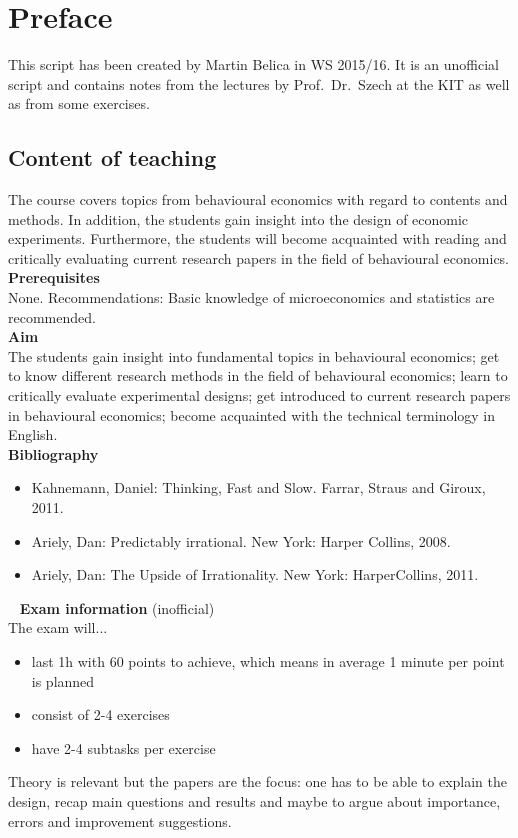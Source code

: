 

\chapter*{Preface}
This script has been created by Martin Belica in WS 2015/16. It is an unofficial script and contains notes from the lectures by Prof.~Dr.~Szech at the KIT as well as from some exercises.
\section*{Content of teaching}
The course covers topics from behavioural economics with regard to contents and methods. In addition, the students gain insight into the design of economic experiments. Furthermore, the students will become acquainted with reading and critically evaluating current research papers in the field of behavioural economics. \\

\textbf{Prerequisites} \\
None. Recommendations: Basic knowledge of microeconomics and statistics are recommended. \\

\textbf{Aim} \\
The students gain insight into fundamental topics in behavioural economics;
get to know different research methods in the field of behavioural economics;
learn to critically evaluate experimental designs;
get introduced to current research papers in behavioural economics;
become acquainted with the technical terminology in English. \\

\textbf{Bibliography}
\begin{itemize}
	\item Kahnemann, Daniel: Thinking, Fast and Slow. Farrar, Straus and Giroux, 2011.
	\item Ariely, Dan: Predictably irrational. New York: Harper Collins, 2008.
	\item Ariely, Dan: The Upside of Irrationality. New York: HarperCollins, 2011. 
\end{itemize}
~\newline
\textbf{Exam information} (inofficial) \\
The exam will...
\begin{itemize}
	\item last 1h with 60 points to achieve, which means in average 1 minute per point is planned
	\item consist of 2-4 exercises
	\item have 2-4 subtasks per exercise 
\end{itemize}
Theory is relevant but the papers are the focus: one has to be able to explain the design, recap main questions and results and maybe to argue about importance, errors and improvement suggestions.

